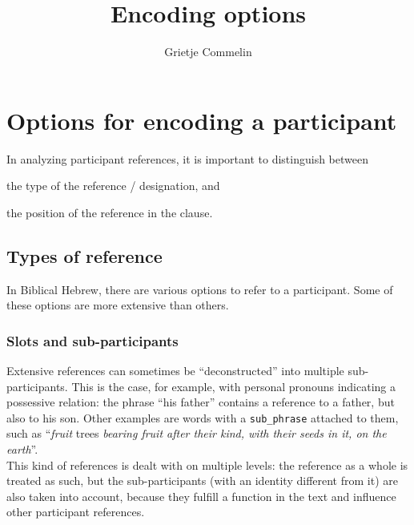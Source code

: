 \documentclass{report}
\title{Encoding options}
\author{Grietje Commelin}
\newcommand{\mi}[1]{\lstinline{#1}}
\begin{document}
\maketitle


\section{Options for encoding a participant}

In analyzing participant references, it is important to distinguish between
\begin{enumerate*}[label=\itshape\alph*\upshape)]
\item the type of the reference / designation, and
\item the position of the reference in the clause.
\end{enumerate*}

\subsection{Types of reference}
In Biblical Hebrew, there are various options to refer to a participant. Some of these options are more extensive than others.


\subsubsection{Slots and sub-participants}
Extensive references can sometimes be ``deconstructed'' into multiple sub-participants. This is the case, for example, with personal pronouns indicating a possessive relation: the phrase ``his father'' contains a reference to a father, but also to his son. Other examples are words with a \mi{sub_phrase} attached to them, such as ``\emph{fruit} trees \emph{bearing fruit after their kind, with their seeds in it, on the earth}''.\\
This kind of references is dealt with on multiple levels: the reference as a whole is treated as such, but the sub-participants (with an identity different from it) are also taken into account, because they fulfill a function in the text and influence other participant references.
\end{document}
